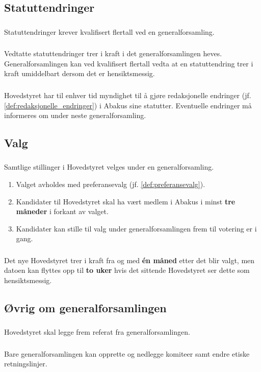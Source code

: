 \subsection{Statuttendringer}
\subsubsection{}
Statuttendringer krever kvalifisert flertall ved en generalforsamling.

\subsubsection{}
Vedtatte statuttendringer trer i kraft i det generalforsamlingen heves. Generalforsamlingen kan ved kvalifisert
 flertall vedta at en statuttendring trer i kraft umiddelbart dersom det er hensiktsmessig.

\subsubsection{}
Hovedstyret har til enhver tid myndighet til å gjøre redaksjonelle endringer (jf. \ref{def:redaksjonelle_endringer}) i
 Abakus sine statutter. Eventuelle endringer må informeres om under neste generalforsamling.

\subsection{Valg}
\subsubsection{}\label{subsec:genfors_valg}
Samtlige stillinger i Hovedstyret velges under en generalforsamling.
\begin{enumerate}[label=\alph*)]
    \item Valget avholdes med preferansevalg (jf. \ref{def:preferansevalg}).
    \item Kandidater til Hovedstyret skal ha vært medlem i Abakus i minst \textbf{tre måneder} i forkant av valget.
    \item Kandidater kan stille til valg under generalforsamlingen frem til votering er i gang.
\end{enumerate}

\subsubsection{}
Det nye Hovedstyret trer i kraft fra og med \textbf{én måned} etter det blir valgt, men datoen kan
flyttes opp til \textbf{to uker} hvis det sittende Hovedstyret ser dette som hensiktsmessig.

\subsection{Øvrig om generalforsamlingen}
\subsubsection{}
Hovedstyret skal legge frem referat fra generalforsamlingen.

\subsubsection{}
Bare generalforsamlingen kan opprette og nedlegge komiteer samt endre etiske retningslinjer.
